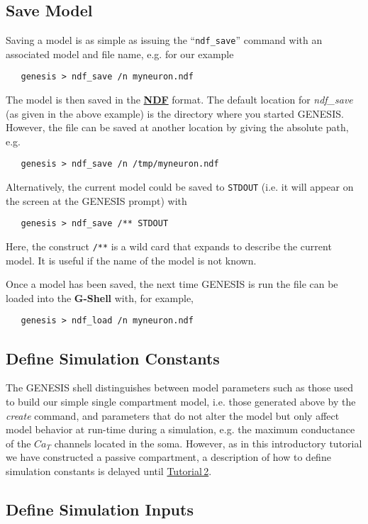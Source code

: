\documentclass[12pt]{article}
\begin{document}
\subsection*{Save Model}

Saving a model is as simple as issuing the ``{\tt ndf\_save}'' command with an associated model and file name, e.g. for our example
\begin{verbatim}
   genesis > ndf_save /n myneuron.ndf
\end{verbatim}
The model is then saved in the \href{../ndf-file-format/ndf-file-format.tex}{\bf NDF} format. The default location for {\it ndf\_save} (as given in the above example) is the directory where you started GENESIS. However, the file can be saved at another location by giving the absolute path, e.g.
\begin{verbatim}
   genesis > ndf_save /n /tmp/myneuron.ndf
\end{verbatim}
Alternatively, the current model could be saved to {\tt STDOUT} (i.e. it will appear on the screen at the GENESIS prompt) with
\begin{verbatim}
   genesis > ndf_save /** STDOUT
\end{verbatim}
Here, the construct {\tt /**} is a wild card that expands to describe the current model. It is useful if the name of the model is not known.

Once a model has been saved, the next time GENESIS is run the file can be loaded into the {\bf G-Shell} with, for example,
\begin{verbatim}
   genesis > ndf_load /n myneuron.ndf
\end{verbatim}

\subsection*{Define Simulation Constants}

The GENESIS shell distinguishes between model parameters such as those used to build our simple single compartment model, i.e. those generated above by the {\it create} command, and parameters that do not alter the model but only affect model behavior at run-time during a simulation, e.g. the maximum conductance of the $Ca_T$ channels located in the soma. However, as in this introductory tutorial we have constructed a passive compartment, a description of how to define simulation constants is delayed until \href{../tutorial2/tutorial2.tex}{Tutorial\,2}.  

\subsection*{Define Simulation Inputs}
\end{document}

